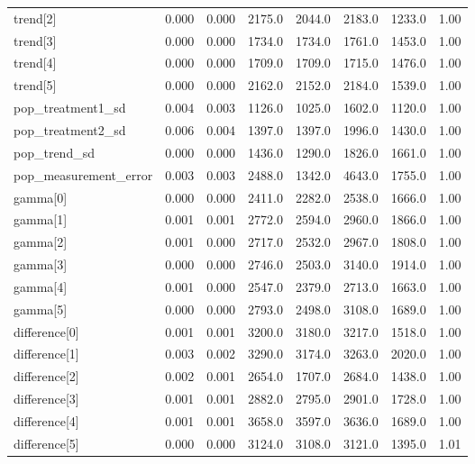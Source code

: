 \begin{tabular}{lrrrrrrr}
trend[2]              &      0.000 &    0.000 &    2175.0 &  2044.0 &    2183.0 &    1233.0 &   1.00 \\
trend[3]              &      0.000 &    0.000 &    1734.0 &  1734.0 &    1761.0 &    1453.0 &   1.00 \\
trend[4]              &      0.000 &    0.000 &    1709.0 &  1709.0 &    1715.0 &    1476.0 &   1.00 \\
trend[5]              &      0.000 &    0.000 &    2162.0 &  2152.0 &    2184.0 &    1539.0 &   1.00 \\
pop\_treatment1\_sd     &      0.004 &    0.003 &    1126.0 &  1025.0 &    1602.0 &    1120.0 &   1.00 \\
pop\_treatment2\_sd     &      0.006 &    0.004 &    1397.0 &  1397.0 &    1996.0 &    1430.0 &   1.00 \\
pop\_trend\_sd          &      0.000 &    0.000 &    1436.0 &  1290.0 &    1826.0 &    1661.0 &   1.00 \\
pop\_measurement\_error &      0.003 &    0.003 &    2488.0 &  1342.0 &    4643.0 &    1755.0 &   1.00 \\
gamma[0]              &      0.000 &    0.000 &    2411.0 &  2282.0 &    2538.0 &    1666.0 &   1.00 \\
gamma[1]              &      0.001 &    0.001 &    2772.0 &  2594.0 &    2960.0 &    1866.0 &   1.00 \\
gamma[2]              &      0.001 &    0.000 &    2717.0 &  2532.0 &    2967.0 &    1808.0 &   1.00 \\
gamma[3]              &      0.000 &    0.000 &    2746.0 &  2503.0 &    3140.0 &    1914.0 &   1.00 \\
gamma[4]              &      0.001 &    0.000 &    2547.0 &  2379.0 &    2713.0 &    1663.0 &   1.00 \\
gamma[5]              &      0.000 &    0.000 &    2793.0 &  2498.0 &    3108.0 &    1689.0 &   1.00 \\
difference[0]         &      0.001 &    0.001 &    3200.0 &  3180.0 &    3217.0 &    1518.0 &   1.00 \\
difference[1]         &      0.003 &    0.002 &    3290.0 &  3174.0 &    3263.0 &    2020.0 &   1.00 \\
difference[2]         &      0.002 &    0.001 &    2654.0 &  1707.0 &    2684.0 &    1438.0 &   1.00 \\
difference[3]         &      0.001 &    0.001 &    2882.0 &  2795.0 &    2901.0 &    1728.0 &   1.00 \\
difference[4]         &      0.001 &    0.001 &    3658.0 &  3597.0 &    3636.0 &    1689.0 &   1.00 \\
difference[5]         &      0.000 &    0.000 &    3124.0 &  3108.0 &    3121.0 &    1395.0 &   1.01 \\
\bottomrule
\end{tabular}
